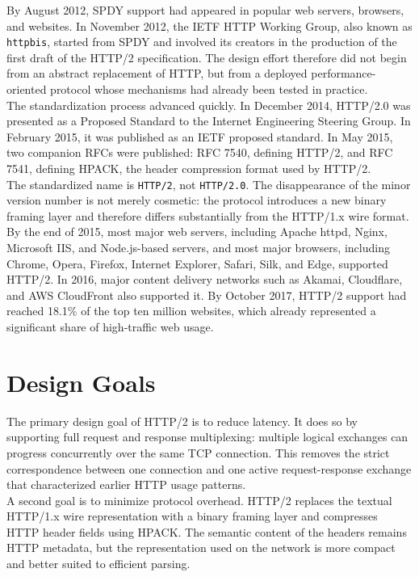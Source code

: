 \documentclass{scrbook}
\begin{document}
By August 2012, SPDY support had appeared in popular web servers, browsers, and websites. In November 2012, the IETF HTTP Working Group, also known as \texttt{httpbis}, started from SPDY and involved its creators in the production of the first draft of the HTTP/2 specification. The design effort therefore did not begin from an abstract replacement of HTTP, but from a deployed performance-oriented protocol whose mechanisms had already been tested in practice.\\

The standardization process advanced quickly. In December 2014, HTTP/2.0 was presented as a Proposed Standard to the Internet Engineering Steering Group. In February 2015, it was published as an IETF proposed standard. In May 2015, two companion RFCs were published: RFC 7540, defining HTTP/2, and RFC 7541, defining HPACK, the header compression format used by HTTP/2.\\

The standardized name is \texttt{HTTP/2}, not \texttt{HTTP/2.0}. The disappearance of the minor version number is not merely cosmetic: the protocol introduces a new binary framing layer and therefore differs substantially from the HTTP/1.x wire format. By the end of 2015, most major web servers, including Apache httpd, Nginx, Microsoft IIS, and Node.js-based servers, and most major browsers, including Chrome, Opera, Firefox, Internet Explorer, Safari, Silk, and Edge, supported HTTP/2. In 2016, major content delivery networks such as Akamai, Cloudflare, and AWS CloudFront also supported it. By October 2017, HTTP/2 support had reached 18.1\% of the top ten million websites, which already represented a significant share of high-traffic web usage.

\section{Design Goals}

The primary design goal of HTTP/2 is to reduce latency. It does so by supporting full request and response multiplexing: multiple logical exchanges can progress concurrently over the same TCP connection. This removes the strict correspondence between one connection and one active request-response exchange that characterized earlier HTTP usage patterns.\\

A second goal is to minimize protocol overhead. HTTP/2 replaces the textual HTTP/1.x wire representation with a binary framing layer and compresses HTTP header fields using HPACK. The semantic content of the headers remains HTTP metadata, but the representation used on the network is more compact and better suited to efficient parsing.\\
\end{document}
